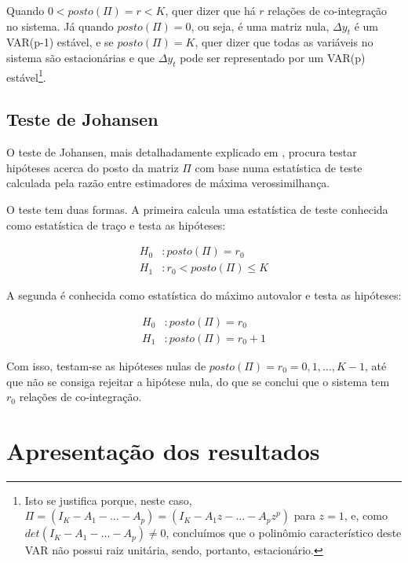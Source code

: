 \documentclass[a4paper,
               article,
               12pt,
               openany,
               oneside,
               english,
               brazil]{abntex2}
\numberwithin{equation}{section}
\begin{document}
   Quando $ 0 < posto(\Pi) = r < K $, quer dizer que há $ r $ relações de co-integração no sistema. Já quando $ posto(\Pi) = 0 $, ou seja, é uma matriz nula, $ \Delta y_t $ é um VAR(p-1) estável, e se $ posto(\Pi) = K $, quer dizer que todas as variáveis no sistema são estacionárias e que $ \Delta y_t $ pode ser representado por um VAR(p) estável\footnote{Isto se justifica porque, neste caso, $ \Pi = (I_K - A_1 - \dots - A_p) = (I_K - A_1z - \dots - A_pz^p) $ para $ z = 1 $, e, como $ det(I_K - A_1 - \dots - A_p) \neq 0 $, concluímos que o polinômio característico deste VAR não possui raiz unitária, sendo, portanto, estacionário.}.

   \subsection{Teste de Johansen}

   O teste de Johansen, mais detalhadamente explicado em \textcite[p.~327-330]{lutkepool}, procura testar hipóteses acerca do posto da matriz $ \Pi $ com base numa estatística de teste calculada pela razão entre estimadores de máxima verossimilhança.

   O teste tem duas formas. A primeira calcula uma estatística de teste conhecida como estatística de traço e testa as hipóteses:

   \begin{equation}
       \label{trace}
       \begin{aligned}
           H_0&: posto(\Pi) = r_0 \\
           H_1&: r_0 < posto(\Pi) \leq K
       \end{aligned}
   \end{equation}

   A segunda é conhecida como estatística do máximo autovalor e testa as hipóteses:

   \begin{equation}
       \label{maxeig}
       \begin{aligned}
           H_0&: posto(\Pi) = r_0 \\
           H_1&: posto(\Pi) = r_0 + 1
       \end{aligned}
   \end{equation}

   Com isso, testam-se as hipóteses nulas de $ posto(\Pi) = r_0 = 0, 1, \dots, K-1 $, até que não se consiga rejeitar a hipótese nula, do que se conclui que o sistema tem $ r_0 $ relações de co-integração.

   \section{Apresentação dos resultados}
\end{document}

